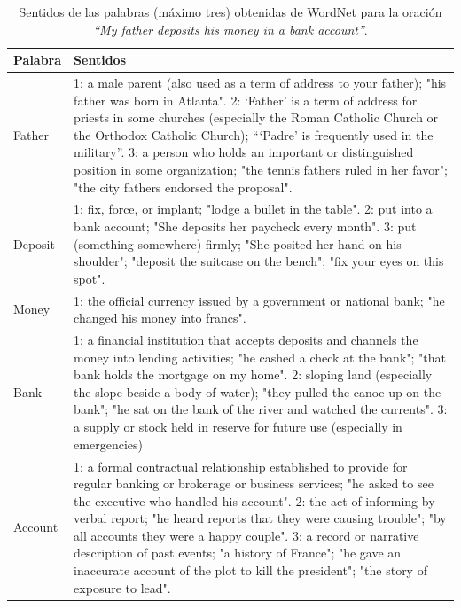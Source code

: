   \begin{table}[t]
    \centering
      \begin{tabular}{|m{2cm}|m{12cm}|}
      \hline
      Palabra & Sentidos\\
      \hline
      \hline
      Father & 1: a male parent (also used as a term of address to your father); "his father was born in Atlanta". 
      2: `Father' is a term of address for priests in some churches (especially the Roman Catholic Church or the Orthodox Catholic Church); “`Padre' is frequently used in the military”. 
      3: a person who holds an important or distinguished position in some organization; "the tennis fathers ruled in her favor"; "the city fathers endorsed the proposal".\\
      \hline
      Deposit & 1: fix, force, or implant; "lodge a bullet in the table". 
      2: put into a bank account; "She deposits her paycheck every month". 
      3: put (something somewhere) firmly; "She posited her hand on his shoulder"; "deposit the suitcase on the bench"; "fix your eyes on this spot".\\
      \hline
      Money & 1: the official currency issued by a government or national bank; "he changed his money into francs".  \\
      \hline
      Bank & 1: a financial institution that accepts deposits and channels the money into lending activities; "he cashed a check at the bank"; "that bank holds the mortgage on my home". 
      2: sloping land (especially the slope beside a body of water); "they pulled the canoe up on the bank"; "he sat on the bank of the river and watched the currents". 
      3: a supply or stock held in reserve for future use (especially in emergencies) \\
      \hline
      Account& 1: a formal contractual relationship established to provide for regular banking or brokerage or business services; "he asked to see the executive who handled his account". 
      2: the act of informing by verbal report; "he heard reports that they were causing trouble"; "by all accounts they were a happy couple". 
      3: a record or narrative description of past events; "a history of France"; "he gave an inaccurate account of the plot to kill the president"; "the story of exposure to lead".\\
      \hline
    \end{tabular}
    \caption{Sentidos de las palabras (máximo tres) obtenidas de WordNet para la oración \textit{“My father deposits his money in a bank account”}.\cite{001}}
    \label{tab:lesk01}
  \end{table}

